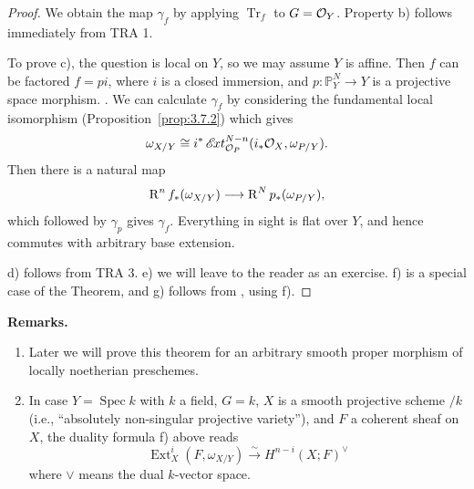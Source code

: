 \begin{proof}
We obtain the map $\gamma_f$ by applying $\operatorname{Tr}_f$ to $G=\mathcal{O}_Y$. Property b) follows immediately from TRA 1.

To prove c), the question is local on $Y$, so we may assume $Y$ is affine. Then $f$ can be factored $f=pi$, where $i$ is a closed immersion, and $p\colon\mathbb{P}_Y^N\to Y$ is a projective space morphism. \cite[\nopp II,~5.5.4]{EGA}. We can calculate $\gamma_f$ by considering the fundamental local isomorphism (Proposition~\ref{prop:3.7.2}) which gives
\[
\omega_{X/Y} \cong i^* \mathop{\mathscr{E}\!xt}\nolimits_{\mathcal{O}_P}^{N-n}(i_*\mathcal{O}_X, \omega_{P/Y}).
\]
Then there is a natural map
\[
\operatorname{R}^n f_*(\omega_{X/Y}) \longrightarrow \operatorname{R}^N p_*(\omega_{P/Y}),
\]
which followed by $\gamma_p$ gives $\gamma_f$. Everything in sight is flat over $Y$, and hence commutes with arbitrary base extension.

d) follows from TRA 3.
e) we will leave to the reader as an exercise.
f) is a special case of the Theorem, and
g) follows from \cite[\nopp III,~4.3.1]{EGA}, using f).
\end{proof}

\textbf{Remarks.}
\begin{enumerate}
\item Later we will prove this theorem for an arbitrary smooth proper morphism of locally noetherian preschemes.
\item In case $Y=\operatorname{Spec}k$ with $k$ a field, $G=k$, $X$ is a smooth projective scheme $/k$ (i.e., ``absolutely non-singular projective variety''), and $F$ a coherent sheaf on $X$, the duality formula f) above reads
\[
\operatorname{Ext}_X^i(F, \omega_{X/Y}) \xrightarrow{\sim} H^{n-i}(X;F)^{\vee}
\]
where $\vee$ means the dual $k$-vector space.
\end{enumerate}
\par
\endgroup

